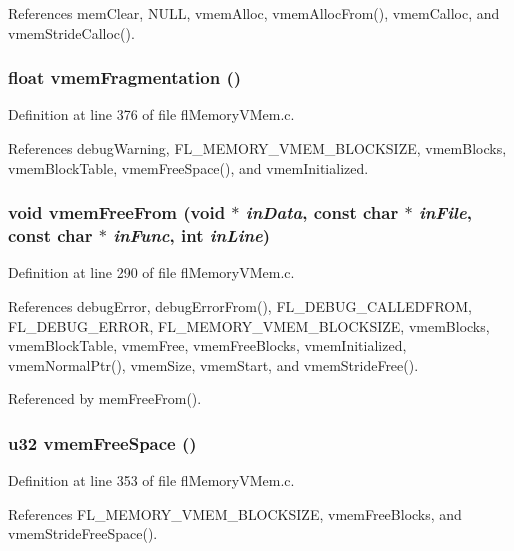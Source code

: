 References mem\-Clear, NULL, vmem\-Alloc, vmem\-Alloc\-From(), vmem\-Calloc, and vmem\-Stride\-Calloc().
\subsubsection{\setlength{\rightskip}{0pt plus 5cm}float vmem\-Fragmentation ()}\label{flMemoryVMem_8h_d65d9069bd87a54399bbc16b629ec252}




Definition at line 376 of file fl\-Memory\-VMem.c.

References debug\-Warning, FL\_\-MEMORY\_\-VMEM\_\-BLOCKSIZE, vmem\-Blocks, vmem\-Block\-Table, vmem\-Free\-Space(), and vmem\-Initialized.
\subsubsection{\setlength{\rightskip}{0pt plus 5cm}void vmem\-Free\-From (void $\ast$ {\em in\-Data}, const char $\ast$ {\em in\-File}, const char $\ast$ {\em in\-Func}, int {\em in\-Line})}\label{flMemoryVMem_8h_26a131b91a9f5fa087737310af66299a}




Definition at line 290 of file fl\-Memory\-VMem.c.

References debug\-Error, debug\-Error\-From(), FL\_\-DEBUG\_\-CALLEDFROM, FL\_\-DEBUG\_\-ERROR, FL\_\-MEMORY\_\-VMEM\_\-BLOCKSIZE, vmem\-Blocks, vmem\-Block\-Table, vmem\-Free, vmem\-Free\-Blocks, vmem\-Initialized, vmem\-Normal\-Ptr(), vmem\-Size, vmem\-Start, and vmem\-Stride\-Free().

Referenced by mem\-Free\-From().
\subsubsection{\setlength{\rightskip}{0pt plus 5cm}u32 vmem\-Free\-Space ()}\label{flMemoryVMem_8h_87da7eb38a8d057e45dc6ce6f346f63f}




Definition at line 353 of file fl\-Memory\-VMem.c.

References FL\_\-MEMORY\_\-VMEM\_\-BLOCKSIZE, vmem\-Free\-Blocks, and vmem\-Stride\-Free\-Space().

